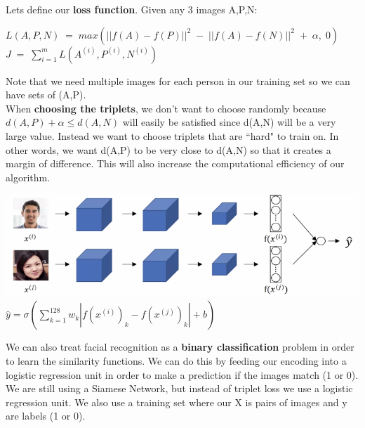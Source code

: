 \documentclass[11pt, a4paper]{article}
\begin{document}
\begin{spacing}{1.1}
	\noindent Lets define our \textbf{loss function}. Given any 3 images A,P,N:
	\begin{center}
	$L(A,P,N) \; = \; max(||f(A) - f(P)||^2 \; - \; ||f(A) - f(N)||^2 \; + \; \alpha, \; 0)$ \vspace*{1mm} \\
	$J \; = \; \sum_{i=1}^{m} L(A^{(i)}, P^{(i)}, N^{(i)})$
	\end{center}
	Note that we need multiple images for each person in our training set so we can have sets of (A,P). \vspace*{2mm}\\
	When \textbf{choosing the triplets}, we don't want to choose randomly because $d(A,P) + \alpha \leq d(A,N)$ will easily be satisfied since d(A,N) will be a very large value. Instead we want to choose triplets that are ``hard" to train on. In other words, we want d(A,P) to be very close to d(A,N) so that it creates a margin of difference. This will also increase the computational efficiency of our algorithm. \\
	\begin{center}
	\includegraphics[scale=.75]{bin_face} \\
	$\hat{y} = \sigma (\sum_{k=1}^{128} w_k |f(x^{(i)})_k - f(x^{(j)})_k| + b)$
	\end{center}
	We can also treat facial recognition as a \textbf{binary classification} problem in order to learn the similarity functions. We can do this by feeding our encoding into a logistic regression unit in order to make a prediction if the images match (1 or 0). We are still using a Siamese Network, but instead of triplet loss we use a logistic regression unit. We also use a training set where our X is pairs of images and y are labels (1 or 0). \\
	

\end{spacing}
\end{document}
